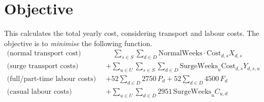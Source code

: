 \documentclass[11pt,a4paper]{article}
\begin{document}
\section{Objective}
This calculates the total yearly cost, considering transport and labour costs.
The objective is to \textit{minimise} the following function.
\begin{align*}
    \text{(normal transport cost)} \qquad&\quad \sum_{s \in S} \sum_{d \in D} \mathrm{NormalWeeks} \cdot \mathrm{Cost}_{d, s}  X_{d,s} \\ 
    \text{(surge transport costs)} \qquad &+ \sum_{u \in U} \sum_{s \in S} \sum_{d \in D} \mathrm{SurgeWeeks}_u \mathrm{Cost}_{d, s} Y_{d,s,u} \\ 
    \text{(full/part-time labour costs)} \qquad &+ 52 \sum_{d \in D} 2750\, P_d + 52 \sum_{d \in D}4500 \,F_d \\
    \text{(casual labour costs)} \qquad &+\sum_{u \in U} \sum_{d \in D} 2951\,\mathrm{SurgeWeeks}_u C_{u,d}
\end{align*}
\end{document}
